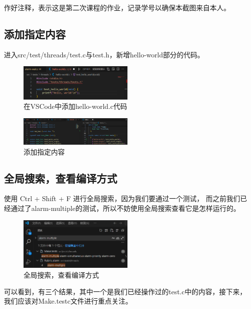 作好注释，表示这是第二次课程的作业，记录学号以确保本截图来自本人。

\subsection{添加指定内容}

进入src/test/threads/test.c与test.h，新增hello-world部分的代码。

\begin{figure}[H]
  \centering
  \includegraphics[width=0.5\textwidth]{img2/helloworld.png}
  \caption{在VSCode中添加hello-world.c代码}
\end{figure}

\begin{figure} [H]
  \centering
  \includegraphics[width=0.5\textwidth]{img2/2.png}
  \caption{添加指定内容}
\end{figure}

\subsection{全局搜索，查看编译方式}

使用 Ctrl + Shift + F 进行全局搜索，因为我们要通过一个测试，
而之前我们已经通过了alarm-multiple的测试，所以不妨使用全局搜索查看它是怎样运行的。

\begin{figure}[H]
  \centering
  \includegraphics[width=0.5\textwidth]{img2/3.png}
  \caption{全局搜索，查看编译方式}
\end{figure}

可以看到，有三个结果，其中一个是我们已经操作过的test.c中的内容，接下来，我们应该对Make.testc文件进行重点关注。

